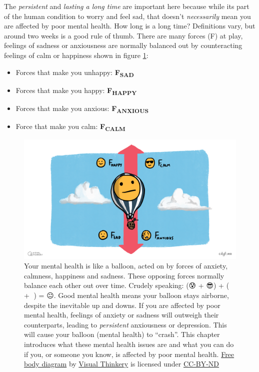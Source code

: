\documentclass[
]{book}
\providecommand{\tightlist}{%
  \setlength{\itemsep}{0pt}\setlength{\parskip}{0pt}}
\begin{document}
The \emph{persistent} and \emph{lasting a long time} are important here because while its part of the human condition to worry and feel sad, that doesn't \emph{necessarily} mean you are affected by poor mental health. How long is a long time? Definitions vary, but around two weeks is a good rule of thumb. There are many forces (F) at play, feelings of sadness or anxiousness are normally balanced out by counteracting feelings of calm or happiness shown in figure \ref{fig:free-body-fig}:

\begin{itemize}
\tightlist
\item
  Forces that make you unhappy: \textbf{F\textsubscript{SAD}}
\item
  Forces that make you happy: \textbf{F\textsubscript{HAPPY}}
\item
  Forces that make you anxious: \textbf{F\textsubscript{ANXIOUS}}
\item
  Force that make you calm: \textbf{F\textsubscript{CALM}}
\end{itemize}

\begin{figure}

{\centering \includegraphics[width=0.99\linewidth]{images/Free body diagram} 

}

\caption{Your mental health is like a balloon, acted on by forces of anxiety, calmness, happiness and sadness. These opposing forces normally balance each other out over time. Crudely speaking: (😰 + 😎) + (🙂 + 🙁) = 😐. Good mental health means your balloon stays airborne, despite the inevitable up and downs. If you are affected by poor mental health, feelings of anxiety or sadness will outweigh their counterparts, leading to \emph{persistent} anxiousness or depression. This will cause your balloon (mental health) to ``crash''. This chapter introduces what these mental health issues are and what you can do if you, or someone you know, is affected by poor mental health. \href{https://en.wikipedia.org/wiki/Free_body_diagram}{Free body diagram} by \href{https://visualthinkery.com}{Visual Thinkery} is licensed under \href{https://creativecommons.org/licenses/by-nd/4.0/}{CC-BY-ND} 🎈}\label{fig:free-body-fig}
\end{figure}
\end{document}
